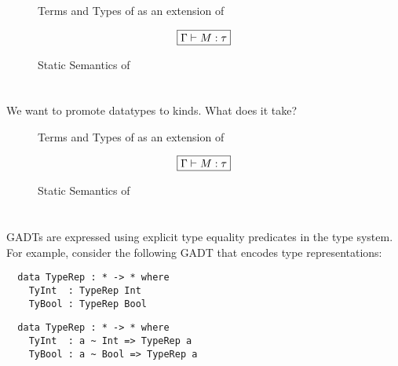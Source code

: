 \documentclass[manuscript,screen,nonacm]{acmart}
\begin{document}
\begin{figure}[ht]
  \caption{Terms and Types of \SFR as an extension of \SFC}
  \begin{syntax}
    
  \end{syntax}
  \label{fig:system-fcr-syntax}
\end{figure}

\begin{figure}[ht]
  \centering
  \begin{gather*}
    \fbox{$\Gamma \vdash M : \tau$}
  \end{gather*}
  \caption{Static Semantics of \SFR}
  \label{fig:sfr-typing}
\end{figure}




\section{\SFP}\label{sec:sfp} %
We want to promote datatypes to kinds. What does it take?
\begin{figure}[ht]
  \centering
    \caption{Terms and Types of \SFP as an extension of \SFC}
  \label{fig:system-fcp-syntax}
\end{figure}


\begin{figure}[ht]
  \centering
  \begin{gather*}
    \fbox{$\Gamma \vdash M : \tau$}
  \end{gather*}
  \caption{Static Semantics of \SFP}
  \label{fig:sfp-typing}
\end{figure}





\section{\SFK}\label{sec:sfk} %
GADTs are expressed using explicit type equality predicates in the type system. For example, consider the following GADT that encodes type representations:

\begin{minipage}[ht]{0.5\linewidth}
  \begin{lstlisting}
  data TypeRep : * -> * where
    TyInt  : TypeRep Int
    TyBool : TypeRep Bool
  \end{lstlisting}
\end{minipage}%
\begin{minipage}[ht]{0.5\linewidth}
  \begin{lstlisting}
  data TypeRep : * -> * where
    TyInt  : a ~ Int => TypeRep a
    TyBool : a ~ Bool => TypeRep a
  \end{lstlisting}
\end{minipage}
\end{document}
